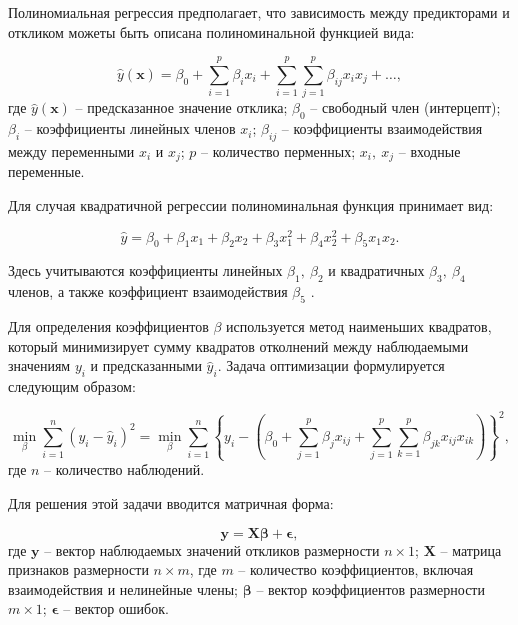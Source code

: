 Полиномиальная регрессия предполагает, что зависимость между предикторами и откликом
можеты быть описана полиноминальной функцией вида:

\begin{equation*}
    \hat{y}(\mathbf{x}) = \beta_0 + \sum_{i=1}^{p} \beta_i x_i + \sum_{i=1}^{p} \sum_{j=1}^{p} \beta_{ij} x_i x_j + \ldots,
\end{equation*}
где $\hat{y}(\mathbf{x})$ -- предсказанное значение отклика;
$\beta_0$ -- свободный член (интерцепт);
$\beta_i$ -- коэффициенты линейных членов $x_i$;
$\beta_{ij}$ -- коэффициенты взаимодействия между переменными $x_i$ и $x_j$;
$p$ -- количество перменных;
$x_i,~x_j$ -- входные переменные.

Для случая квадратичной регрессии полиноминальная функция принимает вид:

\begin{equation*}
    \hat{y} = \beta_0 + \beta_1 x_1 + \beta_2 x_2 + \beta_3 x_1^2
    + \beta_4 x_2^2 + \beta_5 x_1 x_2.
\end{equation*}

Здесь учитываются коэффициенты линейных $\beta_1,~\beta_2$ и квадратичных $\beta_3,~\beta_4$ членов,
а также коэффициент взаимодействия $\beta_5$ \cite{heiberger2009polynomial}.

Для определения коэффициентов $\beta$ используется метод наименьших квадратов,
который минимизирует сумму квадратов отколнений между наблюдаемыми значениям $y_i$
и предсказанными $\hat{y}_i$. Задача оптимизации формулируется следующим образом:

\begin{equation*}
    \min_{\beta} \sum_{i=1}^{n} (y_i - \hat{y}_i)^2 =
    \min_{\beta} \sum_{i=1}^{n} \left\{
    y_i - \left(\beta_0 + \sum_{j=1}^{p} \beta_j x_{ij}
    + \sum_{j=1}^{p} \sum_{k=1}^{p} \beta_{jk} x_{ij} x_{ik}
    \right)
    \right\}^2,
\end{equation*}
где $n$ -- количество наблюдений.

Для решения этой задачи вводится матричная форма:

\begin{equation*}
    \mathbf{y} = \mathbf{X} \boldsymbol{\beta} + \boldsymbol{\epsilon},
\end{equation*}
где $\mathbf{y}$ -- вектор наблюдаемых значений откликов размерности $n \times 1$;
$\mathbf{X}$ -- матрица признаков размерности $n \times m$, где $m$ -- количество коэффициентов,
включая взаимодействия и нелинейные члены;
$\boldsymbol{\beta}$ -- вектор коэффициентов размерности $m \times 1$;
$\boldsymbol{\epsilon}$ -- вектор ошибок.

